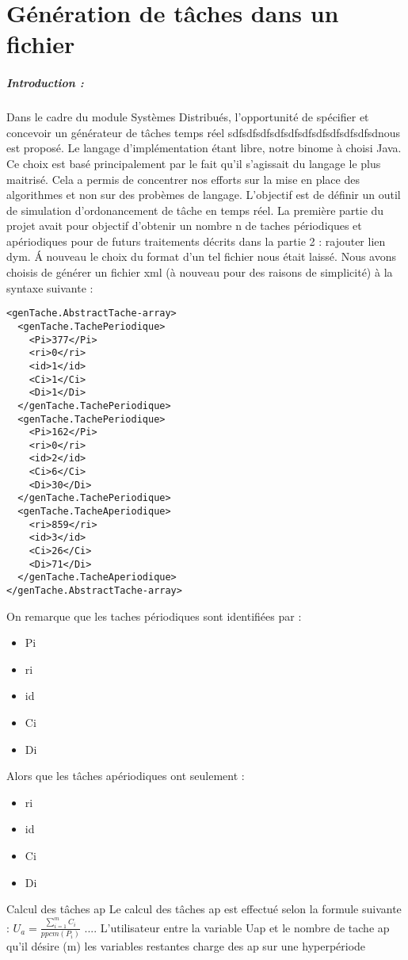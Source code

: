 \chapter{Génération de tâches dans un fichier}
\paragraph{Introduction :}
Dans le cadre du module Systèmes Distribués, l'opportunité de  spécifier et concevoir  un générateur de tâches temps réel sdfsdfsdfsdfsdfsdfsdfsdfsdfsdfsdnous est proposé. Le langage d'implémentation étant libre, notre binome à choisi Java. Ce choix est basé principalement par le fait qu'il s'agissait du langage le plus maitrisé. Cela a permis de concentrer nos efforts sur la mise en place des algorithmes et non sur des probèmes de langage.
 L'objectif est de définir un outil de simulation  d'ordonancement de tâche en temps réel.
La première partie du projet avait pour objectif d'obtenir un nombre n de taches périodiques et apériodiques pour de futurs traitements décrits dans la partie 2 : rajouter lien dym. \'A nouveau le choix du format d'un tel fichier nous était laissé. Nous avons choisis de générer un fichier xml (à nouveau pour des raisons  de simplicité) à la syntaxe suivante : 

\begin{lstlisting}
<genTache.AbstractTache-array>
  <genTache.TachePeriodique>
    <Pi>377</Pi>
    <ri>0</ri>
    <id>1</id>
    <Ci>1</Ci>
    <Di>1</Di>
  </genTache.TachePeriodique>
  <genTache.TachePeriodique>
    <Pi>162</Pi>
    <ri>0</ri>
    <id>2</id>
    <Ci>6</Ci>
    <Di>30</Di>
  </genTache.TachePeriodique>
  <genTache.TacheAperiodique>
    <ri>859</ri>
    <id>3</id>
    <Ci>26</Ci>
    <Di>71</Di>
  </genTache.TacheAperiodique>
</genTache.AbstractTache-array>
\end{lstlisting}
On remarque que les taches périodiques sont identifiées par : 
\begin{itemize}
\item
Pi 
\item
ri 
\item
id 
\item
Ci
\item
Di  
\end{itemize} 
Alors que les tâches apériodiques ont seulement : 
\begin{itemize}
\item
ri 
\item
id 
\item
Ci
\item
Di 
\end{itemize} 

Calcul des tâches ap  
Le calcul des tâches ap est effectué selon la formule suivante : $ U_a =  \frac{\sum_{i=1}^m C_i}{ppcm(P_i)}$   ....  L'utilisateur entre la variable Uap  et le nombre de tache ap qu'il désire (m) les variables restantes 
charge des ap sur une hyperpériode 
